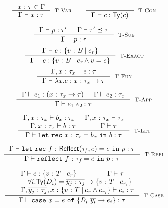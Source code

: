 \hfill{\fbox{\hastype{\env}{\prog}{\typ}}}\\
$$
\inference{
	\tbind{x}{\gtyp}\in\env
}{
	\hastype{\env}{x}{\gtyp}
}[\rtvar]
\qquad
\inference{
}{
	\hastype{\env}{c}{\constty{c}}
}[\rtconst]
$$

$$
\inference{
	\hastype{\env}{\prog}{\typ'} &
	\issubtype{\env}{\typ'}{\typ}
}{
	\hastype{\env}{\prog}{\typ}
}[\rtsub]
$$
$$
\inference{
	\hastype{\env}{e}{\tref{v}{\btyp}{\reft_r}}
}{
	\hastype{\env}{e}{\tref{v}{\btyp}{\reft_r\land v = e}}
}[\rtexact]
$$
$$
\inference{
	\hastype{\env, \tbind{x}{\typ_x}}{e}{\typ}
}{
	\hastype{\env}{\efun{x}{\typ}{e}}{\tfun{x}{\typ_x}{\typ}}
}[\rtfun]
$$

$$
\inference{
	\hastype{\env}{e_1}{(\tfun{x}{\typ_x}{\typ})} &&
	\hastype{\env}{e_2}{\typ_x}
}{
	\hastype{\env}{e_1\ e_2}{\typ}
}[\rtapp]
$$

$$
\inference
	{\hastype{\env, \tbind{x}{\gtyp_x}}{\bd_x}{\gtyp_x} &
	 \iswellformed{\env, \tbind{x}{\gtyp_x}}{\typ_x} \\
	 \hastype{\env, \tbind{x}{\gtyp_x}}{\bd}{\gtyp} &
	 \iswellformed{\env}{\typ}}
	{\hastype{\env}{\eletb{x}{\gtyp_x}{\bd_x}{\bd}}{\typ}}
	[\rtlet]
$$

$$
\inference
	{\hastype{\env}
	 				 {\eletb{f}{\exacttype{\gtyp_f}{e}}{e}{\prog}}
					 {\typ}
	}
	{\hastype{\env}
					 {\erefb{f}{\gtyp_f}{e}{\prog}}
					 {\typ}
	}[\rtreflect]
$$

$$
\inference{
	\hastype{\env}{e}{\tref{v}{T}{e_r}} & \iswellformed{\env}{\typ} \\
	& \forall i. \constty{\dc_i} = \tfunbasic{\overline{\tbind{y_j}{\typ_j}}}{\tref{v}{T}{e_{r_i}}} \\
	& \hastype{\env, \overline{\tbind{y_j}{\typ_j}}, \tbind{x}{\tref{v}{T}{e_r \land e_{r_i}}} }{e_i}{\typ}
}{
	\hastype{\env}{\ecase{x}{e}{\dc_i}{\overline{y_i}}{e_i}}{\typ}
}[\rtcase]
$$
